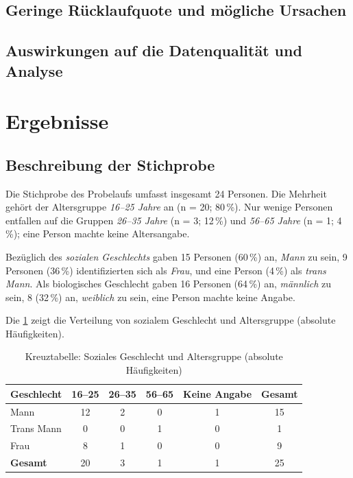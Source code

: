 \subsection{Geringe Rücklaufquote und mögliche Ursachen}

\subsection{Auswirkungen auf die Datenqualität und Analyse}


\section{Ergebnisse} \label{sec:ergebnisse}

\subsection*{Beschreibung der Stichprobe}

Die Stichprobe des Probelaufs umfasst insgesamt 24 Personen. Die Mehrheit gehört der Altersgruppe \emph{16–25 Jahre} an (n = 20; 80\,\%). Nur wenige Personen entfallen auf die Gruppen \emph{26–35 Jahre} (n = 3; 12\,\%) und \emph{56–65 Jahre} (n = 1; 4\,\%); eine Person machte keine Altersangabe.

Bezüglich des \emph{sozialen Geschlechts} gaben 15 Personen (60\,\%) an, \emph{Mann} zu sein, 9 Personen (36\,\%) identifizierten sich als \emph{Frau}, und eine Person (4\,\%) als \emph{trans Mann}. Als biologisches Geschlecht gaben 16 Personen (64\,\%) an, \emph{männlich} zu sein, 8 (32\,\%) an, \emph{weiblich} zu sein, eine Person machte keine Angabe.

Die \cref{tab:kreuztabelle_abs} zeigt die Verteilung von sozialem Geschlecht und Altersgruppe (absolute Häufigkeiten).

\begin{table}[H]
    \centering
    \caption{Kreuztabelle: Soziales Geschlecht und Altersgruppe (absolute Häufigkeiten)}
    \label{tab:kreuztabelle_abs}
    \begin{tabular}{lccccc}
    \toprule
    \textbf{Geschlecht} & 16--25 & 26--35 & 56--65 & Keine Angabe & Gesamt \\
    \midrule
    Mann       & 12 & 2 & 0 & 1 & 15 \\
    Trans Mann &  0 & 0 & 1 & 0 & 1  \\
    Frau       &  8 & 1 & 0 & 0 & 9  \\
    \midrule
    \textbf{Gesamt} & 20 & 3 & 1 & 1 & 25 \\
    \bottomrule
    \end{tabular}
\end{table}

